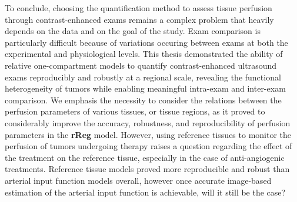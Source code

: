 To conclude, choosing the quantification method to assess tissue perfusion through contrast-enhanced exams remains a complex problem that heavily depends on the data and on the goal of the study.
Exam comparison is particularly difficult because of variations occuring between exams at both the experimental and physiological levels.
This thesis demonstrated the ability of relative one-compartment models to quantify contrast-enhanced ultrasound exams reproducibly and robustly at a regional scale, revealing the functional heterogeneity of tumors while enabling meaningful intra-exam and inter-exam comparison.
We emphasis the necessity to consider the relations between the perfusion parameters of various tissues, or tissue regions, as it proved to considerably improve the accuracy, robustness, and reproducibility of perfusion parameters in the \textbf{rReg} model.
However, using reference tissues to monitor the perfusion of tumors undergoing therapy raises a question regarding the effect of the treatment on the reference tissue, especially in the case of anti-angiogenic treatments.
Reference tissue models proved more reproducible and robust than arterial input function models overall, however once accurate image-based estimation of the arterial input function is achievable, will it still be the case?


\newpage

